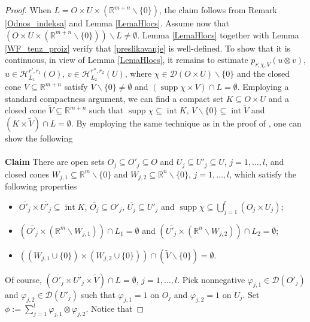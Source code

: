 \documentclass{amsart}
\newcommand{\supp}{\operatorname{supp}}
\theoremstyle{definition}
\begin{document}
\begin{proof}
When $L=O\times U\times(\mathbb{R}^{m+n}\backslash\{0\})$, the claim follows from Remark \ref{Odnos_indeksa} and Lemma \ref{LemaHlocs}. Assume now that $(O\times U\times(\mathbb{R}^{m+n}\backslash\{0\}))\backslash L\neq \emptyset$. Lemma \ref{LemaHlocs} together with Lemma \ref{WF_tenz_proiz} verify that \eqref{preslikavanje} is well-defined. To show that it is continuous, in view of Lemma \ref{LemaHlocs}, it remains to estimate $p_{r;\chi,V} (u\otimes v)$, $u\in \mathscr{H}_{L_1} ^{r',r_1} (O)$, $v\in\mathscr{H}_{L_2} ^{r'',r_2} (U)$, where $\chi\in\mathcal{D}(O\times U)\backslash\{0\}$ and the closed cone $V\subseteq \mathbb{R}^{m+n}$ satisfy $V\backslash\{0\}\neq \emptyset$ and $(\supp\chi\times V)\cap L=\emptyset$. Employing a standard compactness argument, we can find a compact set $K\subseteq O\times U$ and a closed cone $\widetilde{V}\subseteq \mathbb{R}^{m+n}$ such that $\supp\chi\subseteq \operatorname{int}K$, $V\backslash\{0\}\subseteq \operatorname{int}\widetilde{V}$ and $(K\times \widetilde{V})\cap L=\emptyset$. By employing the same technique as in the proof of \cite[Lemma 4.3]{Brouder}, one can show the following\\
\\
\noindent\textbf{Claim} There are open sets $O_j\subseteq O'_j\subseteq O$ and $U_j\subseteq U'_j\subseteq U$, $j=1,\ldots,l$, and closed cones $W_{j,1}\subseteq \mathbb{R}^m\backslash\{0\}$ and $W_{j,2}\subseteq\mathbb{R}^n\backslash\{0\}$, $j=1,\ldots,l$, which satisfy the following properties
\begin{itemize}
    \item[$(i)$] $\overline{O'_j}\times \overline{U'_j}\subseteq \operatorname{int}K$, $\overline{O_j}\subseteq O'_j$, $\overline{U_j}\subseteq U'_j$ and $\supp\chi\subseteq \bigcup_{j=1}^l(O_j\times U_j)$;
    \item[$(ii)$] $(\overline{O'_j}\times (\mathbb{R}^m\backslash W_{j,1}))\cap L_1=\emptyset$ and $(\overline{U'_j}\times(\mathbb{R}^n\backslash W_{j,2}))\cap L_2=\emptyset$;
    \item[$(iii)$] $\left((W_{j,1}\cup\{0\})\times (W_{j,2}\cup\{0\})\right)\cap (\widetilde{V}\backslash\{0\})=\emptyset$.
\end{itemize}
\vspace{10 pt}
\noindent Of course, $(\overline{O'_j}\times \overline{U'_j}\times \widetilde{V})\cap L=\emptyset$, $j=1,\ldots,l$. Pick nonnegative $\varphi_{j,1}\in\mathcal{D}(O'_j)$ and $\varphi_{j,2}\in\mathcal{D}(U'_j)$ such that $\varphi_{j,1}=1$ on $O_j$ and $\varphi_{j,2}=1$ on $U_j$. Set $\phi:=\sum_{j=1}^l \varphi_{j,1}\otimes\varphi_{j,2}$. Notice that

\end{proof}
\end{document}
